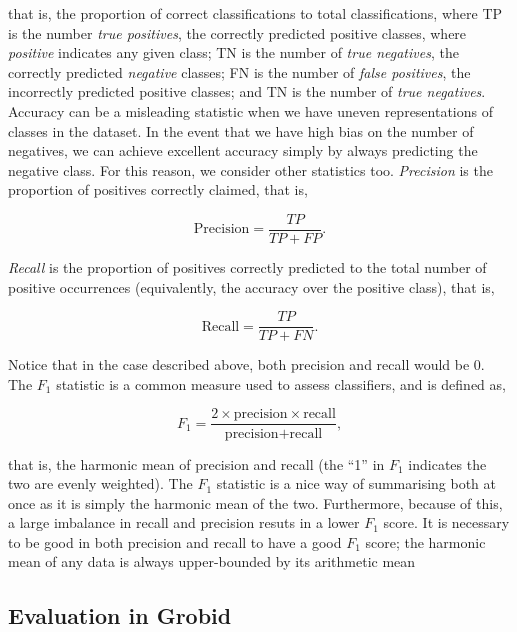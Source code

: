 that is, the proportion of correct classifications to total classifications, where TP is the number \emph{true positives}, the correctly predicted positive classes, where \emph{positive} indicates any given class; TN is the number of \emph{true negatives}, the correctly predicted \emph{negative} classes; FN is the number of \emph{false positives}, the incorrectly predicted positive classes; and TN is the number of \emph{true negatives}. Accuracy can be a misleading statistic when we have uneven representations of classes in the dataset. In the event that we have high bias on the number of negatives, we can achieve excellent accuracy simply by always predicting the negative class. For this reason, we consider other statistics too. \emph{Precision} is the proportion of positives correctly claimed, that is,

\begin{equation}
\text{Precision} = \frac{TP}{TP + FP}.
\label{eq:precision}
\end{equation}

\emph{Recall} is the proportion of positives correctly predicted to the total number of positive occurrences (equivalently, the accuracy over the positive class), that is,

\begin{equation}
\text{Recall} = \frac{TP}{TP + FN}.
\label{eq:recall}
\end{equation}

Notice that in the case described above, both precision and recall would be 0. The $F_1$ statistic is a common measure used to assess classifiers, and is defined as,

\begin{equation}
F_1 = \frac{2 \times \text{precision} \times \text{recall}}{\text{precision} + \text{recall}},
\label{eq:f1}
\end{equation}

that is, the harmonic mean of precision and recall (the ``1'' in $F_1$ indicates the two are evenly weighted). The $F_1$ statistic is a nice way of summarising both at once as it is simply the harmonic mean of the two. Furthermore, because of this, a large imbalance in recall and precision resuts in a lower $F_1$ score. It is necessary to be good in both precision and recall to have a good $F_1$ score; the harmonic mean of any data is always upper-bounded by its arithmetic mean

\subsection{Evaluation in Grobid}

